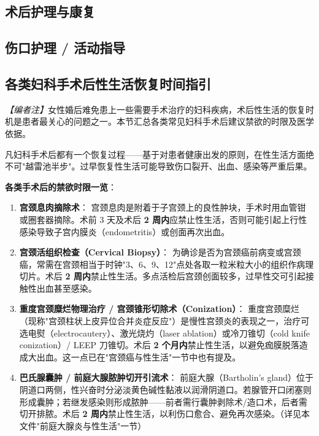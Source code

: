 \begin{enumerate}
\section{术后护理与康复}
\subsection{伤口护理 / 活动指导}
\subsection{各类妇科手术后性生活恢复时间指引}

\noindent\textit{【编者注】}女性婚后难免患上一些需要手术治疗的妇科疾病，术后性生活的恢复时机是患者最关心的问题之一。本节汇总各类常见妇科手术后建议禁欲的时限及医学依据。

\vspace{0.5em}
凡妇科手术后都有一个恢复过程——基于对患者健康出发的原则，在性生活方面绝不可"越雷池半步"。过早恢复性生活可能导致伤口裂开、出血、感染等严重后果。

\vspace{0.5em}
\noindent\textbf{各类手术后的禁欲时限一览}：

\begin{enumerate}
	\item \textbf{宫颈息肉摘除术}：
	宫颈息肉是附着于子宫颈上的良性肿块，手术时用血管钳或圈套器摘除。术前 3 天及术后 \textbf{2 周内}应禁止性生活，否则可能引起上行性感染导致子宫内膜炎（endometritis）或创面再次出血。

	\item \textbf{宫颈活组织检查（Cervical Biopsy）}：
	为确诊是否为宫颈癌前病变或宫颈癌，常需在宫颈相当于时钟"3、6、9、12"点处各取一粒米粒大小的组织作病理切片。术后 \textbf{2 周内}禁止性生活。多点活检后宫颈创面较多，过早性交可引起接触性出血甚至感染。

	\item \textbf{重度宫颈糜烂物理治疗 / 宫颈锥形切除术（Conization）}：
	重度宫颈糜烂（现称"宫颈柱状上皮异位合并炎症反应"）是慢性宫颈炎的表现之一，治疗可选电熨（electrocautery）、激光烧灼（laser ablation）或冷刀锥切（cold knife conization）/ LEEP 刀锥切。术后 \textbf{2 个月内}禁止性生活，以避免痂膜脱落造成大出血。这一点已在"宫颈癌与性生活"一节中也有提及。

	\item \textbf{巴氏腺囊肿 / 前庭大腺脓肿切开引流术}：
	前庭大腺（Bartholin's gland）位于阴道口两侧，性兴奋时分泌淡黄色碱性黏液以润滑阴道口。若腺管开口闭塞则形成囊肿；若继发感染则形成脓肿——前者需行囊肿剥除术/造口术，后者需切开排脓。术后 \textbf{2 周内}禁止性生活，以利伤口愈合、避免再次感染。（详见本文件"前庭大腺炎与性生活"一节）


\end{enumerate}
\end{enumerate}
